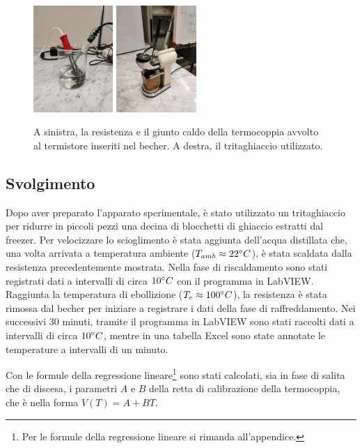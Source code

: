 \documentclass{article}
\begin{document}
\begin{figure}[h!]
\centering
\includegraphics[width=0.27\textwidth]{becher}
\hspace{60pt}
\includegraphics[width=0.27\textwidth]{ice}
\caption{A sinistra, la resistenza e il giunto caldo della termocoppia avvolto al termistore inseriti nel becher. A destra, il tritaghiaccio utilizzato.}
\label{becher_trita}
\end{figure}

\subsection{Svolgimento}
Dopo aver preparato l’apparato sperimentale, è stato utilizzato un tritaghiaccio per ridurre in piccoli pezzi una decina di blocchetti di ghiaccio estratti dal freezer. Per velocizzare lo scioglimento è stata aggiunta dell'acqua distillata che, una volta arrivata a temperatura ambiente ($ T_{amb} \approx 22 \degree C $), è stata scaldata dalla resistenza precedentemente mostrata. Nella fase di riscaldamento sono stati registrati dati a intervalli di circa $10\degree C$ con il programma in LabVIEW. Raggiunta la temperatura di ebollizione ($T_e \approx 100 \degree C$), la resistenza è stata rimossa dal becher per iniziare a registrare i dati della fase di raffreddamento. Nei successivi 30 minuti, tramite il programma in LabVIEW sono stati raccolti dati a intervalli di circa $10\degree C$, mentre in una tabella Excel sono state annotate le temperature a intervalli di un minuto. 

Con le formule della regressione lineare\footnote{Per le formule della regressione lineare si rimanda all'appendice.} \cite{taylor} sono stati calcolati, sia in fase di salita che di discesa, i parametri $A$ e $B$ della retta di calibrazione della termocoppia, che è nella forma $V(T)=A+BT$.
\end{document}
